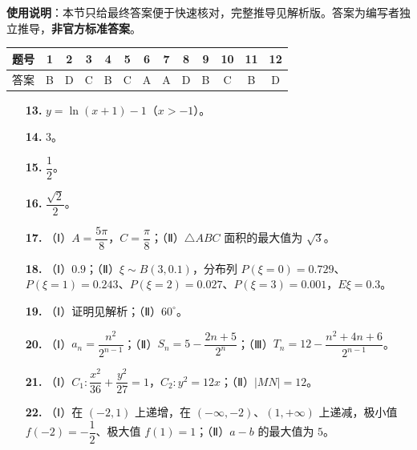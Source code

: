 
\begin{gknotice}
\textbf{使用说明}：本节只给最终答案便于快速核对，完整推导见解析版。答案为编写者独立推导，\textbf{非官方标准答案}。
\end{gknotice}

\begin{center}\begin{tabular}{ccccccccccccc}
\toprule
题号 & 1 & 2 & 3 & 4 & 5 & 6 & 7 & 8 & 9 & 10 & 11 & 12 \\
\midrule
答案 & B & D & C & B & C & A & A & D & B & C & B & D \\
\bottomrule
\end{tabular}\end{center}

\begin{itemize}[leftmargin=2.6em]
  \item[\textbf{13.}] $y=\ln(x+1)-1$（$x>-1$）。
  \item[\textbf{14.}] $3$。
  \item[\textbf{15.}] $\dfrac12$。
  \item[\textbf{16.}] $\dfrac{\sqrt2}2$。
\end{itemize}

\begin{itemize}[leftmargin=2.6em]
  \item[\textbf{17.}] （Ⅰ）$A=\dfrac{5\pi}8$，$C=\dfrac{\pi}8$；（Ⅱ）$\triangle ABC$ 面积的最大值为 $\sqrt3$。
  \item[\textbf{18.}] （Ⅰ）$0.9$；（Ⅱ）$\xi\sim B(3,0.1)$，分布列 $P(\xi=0)=0.729$、$P(\xi=1)=0.243$、$P(\xi=2)=0.027$、$P(\xi=3)=0.001$，$E\xi=0.3$。
  \item[\textbf{19.}] （Ⅰ）证明见解析；（Ⅱ）$60^\circ$。
  \item[\textbf{20.}] （Ⅰ）$a_n=\dfrac{n^2}{2^{n-1}}$；（Ⅱ）$S_n=5-\dfrac{2n+5}{2^n}$；（Ⅲ）$T_n=12-\dfrac{n^2+4n+6}{2^{n-1}}$。
  \item[\textbf{21.}] （Ⅰ）$C_1:\dfrac{x^2}{36}+\dfrac{y^2}{27}=1$，$C_2:y^2=12x$；（Ⅱ）$|MN|=12$。
  \item[\textbf{22.}] （Ⅰ）在 $(-2,1)$ 上递增，在 $(-\infty,-2)$、$(1,+\infty)$ 上递减，极小值 $f(-2)=-\dfrac12$、极大值 $f(1)=1$；（Ⅱ）$a-b$ 的最大值为 $5$。
\end{itemize}
